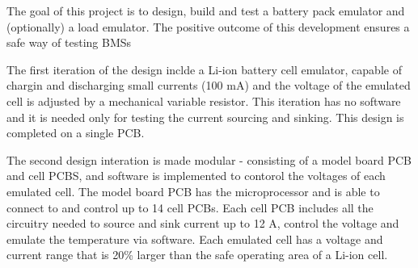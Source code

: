 \IEEEPARstart
{T}{he} goal of this project is to design, build and test a battery pack emulator and (optionally)
a load emulator. The positive outcome of this development ensures a safe way of testing BMSs


The first iteration of the design inclde a Li-ion battery cell emulator, capable of chargin and discharging small currents (100 mA) and
the voltage of the emulated cell is adjusted by a mechanical variable resistor. This iteration has no software and it is needed only for 
testing the current sourcing and sinking. This design is completed on a single PCB.

The second design interation is made modular - consisting of a model board PCB and cell PCBS, and software is implemented to contorol the 
voltages of each emulated cell. The model board PCB has the microprocessor and is able to connect to and control up to 14 cell PCBs. Each
cell PCB includes all the circuitry needed to source and sink current up to 12 A, control the voltage and emulate the temperature via software.
Each emulated cell has a voltage and current range that is 20\% larger than the safe operating area of a Li-ion cell.





 



